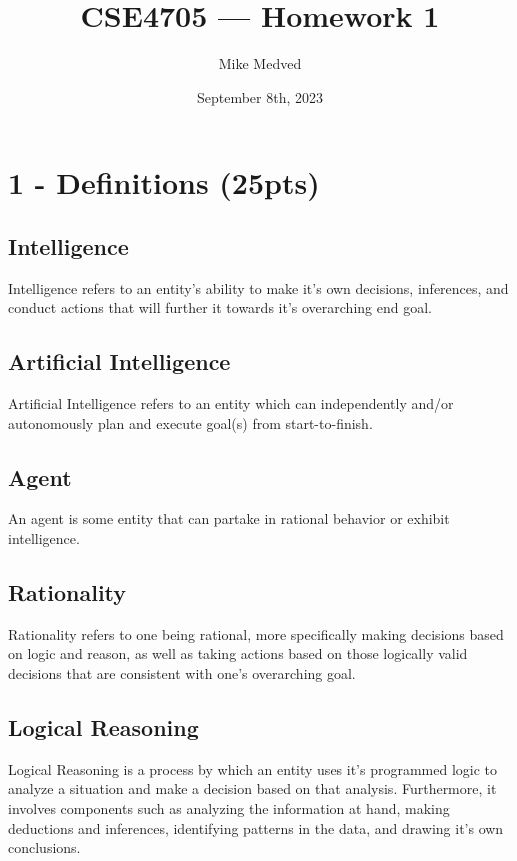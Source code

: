 \documentclass{article}
\title{CSE4705 — Homework 1}
\author{Mike Medved}
\date{September 8th, 2023}
\begin{document}
\maketitle

\section*{1 - Definitions (25pts)}

\subsection*{Intelligence}

Intelligence refers to an entity's ability to make it's own decisions, inferences, and conduct actions that will further it towards it's overarching end goal.

\subsection*{Artificial Intelligence}

Artificial Intelligence refers to an entity which can independently and/or autonomously plan and execute goal(s) from start-to-finish.

\subsection*{Agent}

An agent is some entity that can partake in rational behavior or exhibit intelligence. 

\subsection*{Rationality}

Rationality refers to one being rational, more specifically making decisions based on logic and reason, as well as taking actions based on those logically valid decisions that are consistent with one's overarching goal.

\subsection*{Logical Reasoning}

Logical Reasoning is a process by which an entity uses it's programmed logic to analyze a situation and make a decision based on that analysis. Furthermore, it involves components such as analyzing the information at hand, making deductions and inferences, identifying patterns in the data, and drawing it's own conclusions. 
\end{document}
